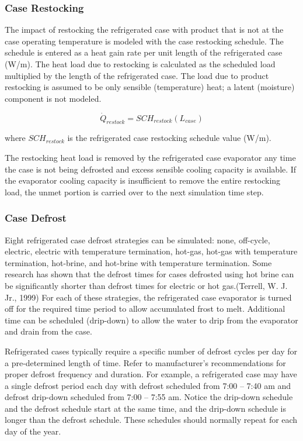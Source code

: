\subsubsection{Case Restocking}\label{case-restocking}

The impact of restocking the refrigerated case with product that is not at the case operating temperature is modeled with the case restocking schedule. The schedule is entered as a heat gain rate per unit length of the refrigerated case (W/m). The heat load due to restocking is calculated as the scheduled load multiplied by the length of the refrigerated case. The load due to product restocking is assumed to be only sensible (temperature) heat; a latent (moisture) component is not modeled.

\begin{equation}
{\dot Q_{restock}} = SC{H_{restock}}\left( {{L_{case}}} \right)
\end{equation}

where \(SC{H_{restock}}\) is the refrigerated case restocking schedule value (W/m).

The restocking heat load is removed by the refrigerated case evaporator any time the case is not being defrosted and excess sensible cooling capacity is available. If the evaporator cooling capacity is insufficient to remove the entire restocking load, the unmet portion is carried over to the next simulation time step.

\subsubsection{Case Defrost}\label{case-defrost}

Eight refrigerated case defrost strategies can be simulated: none, off-cycle, electric, electric with temperature termination, hot-gas, hot-gas with temperature termination, hot-brine, and hot-brine with temperature termination. Some research has shown that the defrost times for cases defrosted using hot brine can be significantly shorter than defrost times for electric or hot gas.(Terrell, W. J. Jr., 1999) For each of these strategies, the refrigerated case evaporator is turned off for the required time period to allow accumulated frost to melt. Additional time can be scheduled (drip-down) to allow the water to drip from the evaporator and drain from the case.

Refrigerated cases typically require a specific number of defrost cycles per day for a pre-determined length of time. Refer to manufacturer's recommendations for proper defrost frequency and duration. For example, a refrigerated case may have a single defrost period each day with defrost scheduled from 7:00 -- 7:40 am and defrost drip-down scheduled from 7:00 -- 7:55 am. Notice the drip-down schedule and the defrost schedule start at the same time, and the drip-down schedule is longer than the defrost schedule. These schedules should normally repeat for each day of the year.

